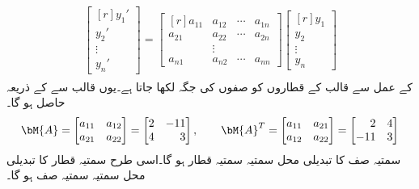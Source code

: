 \begin{gather}
\begin{aligned}
\begin{bmatrix*}[r]
y_1'\\
y_2'\\
\vdots\\
y_n'
\end{bmatrix*}=
\begin{bmatrix*}[r]
a_{11}&a_{12}&\cdots &a_{1n}\\
a_{21}& a_{22}&\cdots &a_{2n}\\
&\vdots & &\\
a_{n1}&a_{n2}&\cdots &a_{nn}
\end{bmatrix*}
\begin{bmatrix*}[r]
y_1\\
y_2\\
\vdots\\
y_n
\end{bmatrix*}
\end{aligned}
\end{gather}
 کے عمل سے قالب کے قطاروں کو صفوں کی جگہ لکھا جاتا ہے۔یوں  قالب  سے  کے ذریعہ   حاصل ہو گا۔ 
\begin{gather*}
\begin{aligned}
\bM{A}=
\begin{bmatrix*}[r]
a_{11} & a_{12}\\
a_{21}& a_{22}
\end{bmatrix*}=
\begin{bmatrix*}[r]
2&-11\\
4&3
\end{bmatrix*},\quad \quad
\bM{A}^T=
\begin{bmatrix*}[r]
a_{11}& a_{21}\\
a_{12}& a_{22}
\end{bmatrix*}=
\begin{bmatrix*}[r]
2 &4\\
-11&3
\end{bmatrix*}
\end{aligned}
\end{gather*}
سمتیہ صف  کا تبدیلی محل سمتیہ  سمتیہ قطار ہو گا۔اسی طرح سمتیہ قطار  کا تبدیلی محل سمتیہ  سمتیہ صف ہو گا۔
